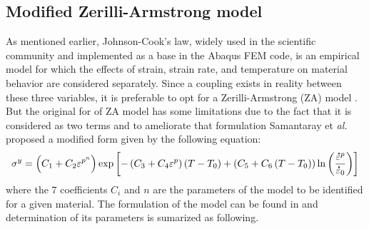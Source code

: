 \documentclass[twoside,english,1p,final,sort&compress]{elsarticle}
\makeatletter
\theoremstyle{plain}
\newcommand{\mdot}[1]{\accentset{\mbox{\bfseries .}}{#1}}
\newcommand*{\eal}{et \emph{al.}\@\xspace}
\makeatother
\begin{document}
\subsection{Modified Zerilli-Armstrong model\label{sec:MZA}}

As mentioned earlier, Johnson-Cook's law, widely used in the scientific community and implemented as a base in the Abaqus FEM code, is an empirical model for which the effects of strain, strain rate, and temperature on material behavior are considered separately. Since a coupling exists in reality between these three variables, it is preferable to opt for a Zerilli-Armstrong (ZA) model \cite{Hull-2011}. But the original for of ZA model has some limitations due to the fact that it is considered as two terms and to ameliorate that formulation Samantaray \eal \cite{Samantaray-2009} proposed a modified form given by the following equation:
\begin{equation}
\label{eq:MZA-model}
\sigma^y = \left(C_{1}+C_{2}\varepsilon^{p^n}\right) \exp\left[-\left(C_{3}+C_{4}\varepsilon^p\right)\left(T-T_0\right) + \left(C_{5}+C_{6}\left(T-T_0\right)\right)\ln\left( \frac{\mdot\varepsilon^p}{\mdot{\varepsilon}_0}\right)\right]
\end{equation}
where the $7$ coefficients $C_i$ and $n$ are the parameters of the model to be identified for a given material. The formulation of the model can be found in \cite{Samantaray-2009} and determination of its parameters is sumarized as following.
\end{document}
